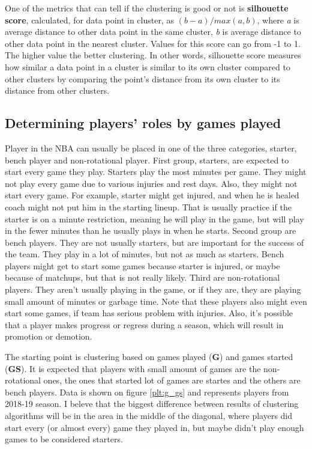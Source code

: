 \documentclass[a4paper]{article}
\begin{document}
One of the metrics that can tell if the clustering is good or not is \textbf{silhouette score}, calculated, for data point in cluster, as $ (b - a)  / max(a, b) $, where \textit{a} is average distance to other data point in the same cluster, \textit{b} is average distance to other data point in the nearest cluster. Values for this score can go from -1 to 1. The higher value the better clustering. In other words, silhouette score measures how similar a data point in a cluster is similar to its own cluster compared to other clusters by comparing the point’s distance from its own cluster to its distance from other clusters. \cite{clustering}

\subsection{Determining players' roles by games played}
\label{subsec:players_roles}

Player in the NBA can usually be placed in one of the three categories, starter, bench player and non-rotational player. First group, starters, are expected to start every game they play. Starters play the most minutes per game. They might not play every game due to various injuries and rest days. Also, they might not start every game. For example, starter might get injured, and when he is healed coach might not put him in the starting lineup. That is usually practice if the starter is on a minute restriction, meaning he will play in the game, but will play in the fewer minutes than he usually plays in when he starts. Second group are bench players. They are not usually starters, but are important for the success of the team. They play in a lot of minutes, but not as much as starters. Bench players might get to start some games because starter is injured, or maybe because of matchups, but that is not really likely. Third are non-rotational players. They aren't usually playing in the game, or if they are, they are playing small amount of minutes or garbage time. Note that these players also might even start some games, if team has serious problem with injuries. Also, it's possible that a player makes progress or regress during a season, which will result in promotion or demotion.

The starting point is clustering based on games played (\textbf{G}) and games started (\textbf{GS}). It is expected that players with small amount of games are the non-rotational ones, the ones that started lot of games are startes and the others are bench players. Data is shown on figure \ref{plt:g_gs} and represents players from 2018-19 season. I beleve that the biggest difference between results of clustering algorithms will be in the area in the middle of the diagonal, where players did start every (or almost every) game they played in, but maybe didn't play enough games to be considered starters.
\end{document}
